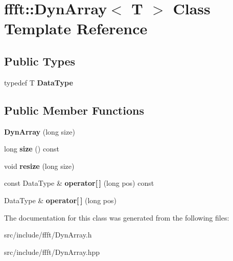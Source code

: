 \hypertarget{classffft_1_1DynArray}{}\section{ffft\+:\+:Dyn\+Array$<$ T $>$ Class Template Reference}
\label{classffft_1_1DynArray}
\subsection*{Public Types}
\begin{DoxyCompactItemize}
\item 
\mbox{\label{classffft_1_1DynArray_aa21fa88c73e511acb18a7e778190ab02}} 
typedef T {\bfseries Data\+Type}
\end{DoxyCompactItemize}
\subsection*{Public Member Functions}
\begin{DoxyCompactItemize}
\item 
\mbox{\label{classffft_1_1DynArray_a26919351a30b4be36c3e3ee500a7c6a7}} 
{\bfseries Dyn\+Array} (long size)
\item 
\mbox{\label{classffft_1_1DynArray_a36eebe95c5f12a370d9f4c281a215c05}} 
long {\bfseries size} () const
\item 
\mbox{\label{classffft_1_1DynArray_a3879167bca7e35ee75596318f67e2930}} 
void {\bfseries resize} (long size)
\item 
\mbox{\label{classffft_1_1DynArray_a74ff037cb856b4a62c81147d357697bc}} 
const Data\+Type \& {\bfseries operator\mbox{[}$\,$\mbox{]}} (long pos) const
\item 
\mbox{\label{classffft_1_1DynArray_a79c769ea7c52d0fbbe67831380b9a89c}} 
Data\+Type \& {\bfseries operator\mbox{[}$\,$\mbox{]}} (long pos)
\end{DoxyCompactItemize}


The documentation for this class was generated from the following files\+:\begin{DoxyCompactItemize}
\item 
src/include/ffft/Dyn\+Array.\+h\item 
src/include/ffft/Dyn\+Array.\+hpp\end{DoxyCompactItemize}
